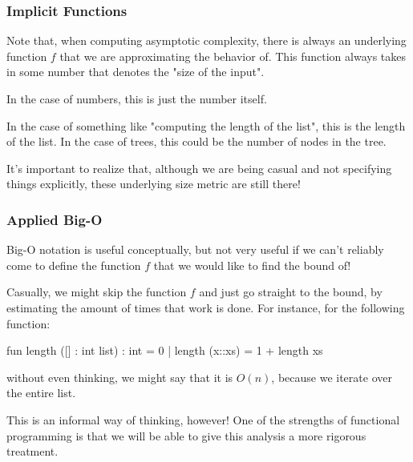 \documentclass[aspectratio=169]{beamer}
\begin{document}
\begin{frame}[fragile]
  \frametitle{Implicit Functions}

  Note that, when computing asymptotic complexity, there is always an underlying
  function $f$ that we are approximating the behavior of. This function always
  takes in some number that denotes the "size of the input".

  \vspace{\fill}

  In the case of numbers, this is just the number itself.

  \vspace{\fill}

  In the case of something like "computing the length of the list", this is the
  length of the list. In the case of trees, this could be the number of nodes in
  the tree.
  
  \vspace{\fill}

  It's important to realize that, although we are being casual and not specifying
  things explicitly, these underlying size metric are still there!
\end{frame}


\begin{frame}[fragile]
  \frametitle{Applied Big-O}

  Big-O notation is useful conceptually, but not very useful if we can't reliably
  come to define the function $f$ that we would like to find the bound of!

  \vspace{\fill}

  Casually, we might skip the function $f$ and just go straight to the bound, by
  estimating the amount of times that work is done. For instance, for the following
  function:

  \vspace{5pt}

  \begin{codeblock}
    fun length ([] : int list) : int = 0
      | length (x::xs) = 1 + length xs
  \end{codeblock}

  \vspace{5pt}

  without even thinking, we might say that it is $O(n)$, because we iterate over
  the entire list.

  \vspace{\fill}

  This is an informal way of thinking, however! One of the strengths of functional
  programming is that we will be able to give this analysis a more rigorous
  treatment.
\end{frame}
\end{document}
